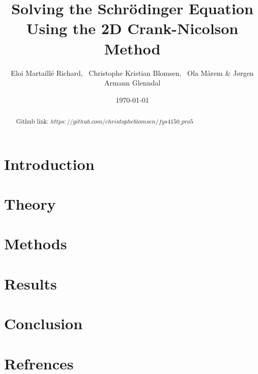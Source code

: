 \documentclass[english,notitlepage,reprint,nofootinbib]{revtex4-2}  %
\begin{document}
	
	\title{Solving the Schrödinger Equation Using the 2D Crank-Nicolson Method}  %
	\author{Eloi Martaillé Richard,
	\
	Christophe Kristian Blomsen,
	\
	Ola Mårem
	\&
	Jørgen Armann Glenndal
    }
	\date{\today}                             %
	\noaffiliation                            %
	
	\begin{abstract}
Github link: \href{https://github.com/christopheblomsen/fys4150_pro5}{$https://github.com/christopheblomsen/fys4150\_pro5$}
\end{abstract}
	\maketitle	
	
	
	\section{Introduction} \label{sec:introduction}


	\section{Theory} \label{sec:theory}
	
	
	
	
	\section{Methods}\label{sec:methods}
	
	
	
	
	\section{Results}\label{sec:results}
	
	
		
	\section{Conclusion}\label{sec:conclusion}
	
	
	
	
	\onecolumngrid
	\section*{Refrences}
	
	
	
\end{document}
